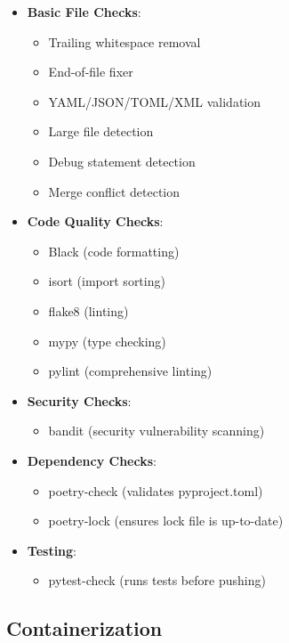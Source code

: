 \begin{itemize}
    \item \textbf{Basic File Checks}:
    \begin{itemize}
        \item Trailing whitespace removal
        \item End-of-file fixer
        \item YAML/JSON/TOML/XML validation
        \item Large file detection
        \item Debug statement detection
        \item Merge conflict detection
    \end{itemize}
    
    \item \textbf{Code Quality Checks}:
    \begin{itemize}
        \item Black (code formatting)
        \item isort (import sorting)
        \item flake8 (linting)
        \item mypy (type checking)
        \item pylint (comprehensive linting)
    \end{itemize}
    
    \item \textbf{Security Checks}:
    \begin{itemize}
        \item bandit (security vulnerability scanning)
    \end{itemize}
    
    \item \textbf{Dependency Checks}:
    \begin{itemize}
        \item poetry-check (validates pyproject.toml)
        \item poetry-lock (ensures lock file is up-to-date)
    \end{itemize}
    
    \item \textbf{Testing}:
    \begin{itemize}
        \item pytest-check (runs tests before pushing)
    \end{itemize}
\end{itemize}

\subsection{Containerization}

